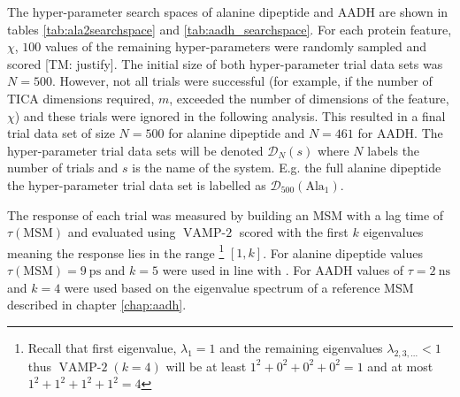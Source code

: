 The hyper-parameter search spaces of alanine dipeptide and AADH are shown in tables \ref{tab:ala2searchspace} and \ref{tab:aadh_searchspace}. For each protein feature, $\chi$, $100$ values of the remaining hyper-parameters were randomly sampled and scored [TM: justify]. The initial size of both hyper-parameter trial data sets was $N=500$. However, not all trials were successful (for example, if the number of TICA dimensions required, $m$, exceeded the number of dimensions of the feature, $\chi$) and these trials were ignored in the following analysis. This resulted in a final trial data set of size $N=500$ for alanine dipeptide and $N=461$ for AADH. The hyper-parameter trial data sets will be denoted $\mathcal{D}_{N}(s)$ where $N$ labels the number of trials and $s$ is the name of the system. E.g. the full alanine dipeptide the hyper-parameter trial data set is labelled as $\mathcal{D}_{500}(\mathrm{Ala}_{1})$. 

The response of each trial was measured by building an MSM with a lag time of $\tau(\mathrm{MSM})$ and evaluated using $\operatorname{VAMP-2}$ scored with the first $k$ eigenvalues meaning the response lies in the range \footnote{Recall that first eigenvalue, $\lambda_{1}=1$ and the remaining eigenvalues  $\lambda_{2,3,...} < 1$ thus $\operatorname{VAMP-2}(k=4)$ will be at least $1^2 + 0^2 + 0^2 + 0^2=1$ and at most $1^2 + 1^2 + 1^2 + 1^2=4$} $[1, k]$. For alanine dipeptide values $\tau(\mathrm{MSM})=\SI{9}{\pico\second}$ and $k=5$ were used in line with \cite{bowmanQuantitativeComparisonAlternative2013}.  For AADH values of $\tau=\SI{2}{\nano\second}$ and $k=4$ were used based on the eigenvalue spectrum of a reference MSM described in chapter \ref{chap:aadh}. 


